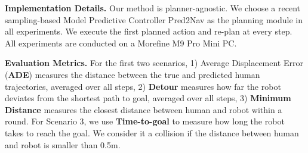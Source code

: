 \textbf{Implementation Details.}
Our method is planner-agnostic. We choose a recent sampling-based Model Predictive Controller Pred2Nav \cite{poddar2023crowd} as the planning module in all experiments. We execute the first planned action and re-plan at every step. 
All experiments are conducted on a Morefine M9 Pro Mini PC.

\textbf{Evaluation Metrics.} For the first two scenarios, 1) Average Displacement Error (\textbf{ADE}) measures the distance between the true and predicted human trajectories, averaged over all steps, 2) \textbf{Detour} measures how far the robot deviates from the shortest path to goal, averaged over all steps, 3) \textbf{Minimum Distance} measures the closest distance between human and robot within a round. 
For Scenario 3, 
we use \textbf{Time-to-goal} to measure how long the robot takes to reach the goal. We consider it a collision if the distance between human and robot is smaller than 0.5m.



